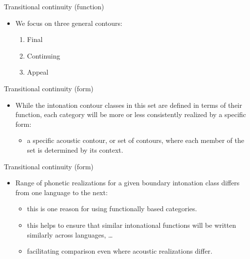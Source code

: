 \documentclass[compress,12pt]{beamer}%
\begin{document}
    \begin{frame}{Transitional continuity (function)}
       \begin{itemize}
         \item We focus on three general contours:
          \begin{enumerate}
            \item {\color{greenish}Final}
            \item {\color{greenish}Continuing}
            \item {\color{greenish}Appeal}
          \end{enumerate}
        \end{itemize}
    \end{frame}
    
    \begin{frame}{Transitional continuity (form)}
      \begin{itemize}
          \item While the intonation contour classes in this set are defined in terms of their function, each category will be more or less consistently realized by a specific form:
          \begin{itemize}
            \item a specific acoustic contour, or set of contours, where each member of the set is determined by its context.
          \end{itemize}
        \end{itemize}
    \end{frame}
    
    \begin{frame}{Transitional continuity (form)}
      \begin{itemize}
        \item Range of phonetic realizations for a given boundary intonation class differs from one language to the next:
          \begin{itemize}
            \item this is one reason for using functionally based categories.
            \item this helps to ensure that similar intonational functions will be written similarly across languages, \ldots
            \item facilitating comparison even where acoustic realizations differ.
          \end{itemize}
        \end{itemize}
    \end{frame}
    
\end{document}
